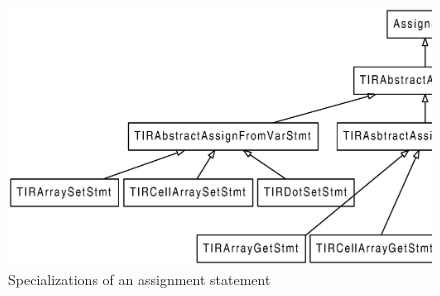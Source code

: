 \begin{figure}[htbp]
\begin{center}
\includegraphics[width=6.2in]{Figures/assign.eps}
\caption{Specializations of an assignment statement}
\label{Fig:assign}
\end{center}
\end{figure}

\DeclareRobustCommand{\lstd}[1]{\\ \phantom{.} \hspace{1cm} \lstinline{#1}} 


